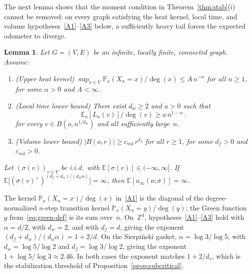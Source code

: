 \documentclass[aop]{imsart}
\theoremstyle{plain}
\newtheorem{lemma}[theorem]{Lemma}
\theoremstyle{definition}
\newcommand{\Z}{\mathbb{Z}}
\newcommand{\E}{\mathbb{E}}
\renewcommand{\P}{\mathbb{P}}
\begin{document}
	The next lemma shows that the moment condition in Theorem~\ref{thm:stab}(i) cannot be removed: on every graph satisfying the heat kernel, local time, and volume hypotheses~\ref{A1}--\ref{A3} below, a sufficiently heavy tail forces the expected odometer to diverge.
	\begin{lemma}\label{lem:moment-sharpness}
		Let $G=(V,E)$ be an infinite, locally finite, connected graph.  Assume:
		\begin{enumerate}[label=\textup{(A\arabic*)}]
			\item\label{A1} \textup{(Upper heat kernel)}\; $\sup_{x\in V}\P_x(X_n=x)/\deg(x)\leq A\,n^{-\alpha}$ for all $n\geq 1$, for some $\alpha>0$ and $A<\infty$.
			\item\label{A2} \textup{(Local time lower bound)}\; There exist $d_w\geq 2$ and $a>0$ such that
			\[
			\E_o[L_n(v)]/\deg(v)\geq a\,n^{1-\alpha}\,.
			\]
			for every $v\in B(o,n^{1/d_w})$ and all sufficiently large~$n$.
			\item\label{A3} \textup{(Volume lower bound)}\; $|B(o,r)|\geq c_{\mathrm{vol}}\,r^{d_f}$ for all $r\geq 1$, for some $d_f>0$ and $c_{\mathrm{vol}}>0$.
		\end{enumerate}
		Let $(\sigma(v))_{v\in V}$ be i.i.d.\ with $\E[\sigma(v)]\in(-\infty,\infty]$.
		If $\E\bigl[(\sigma(v)^+)^{(d_f+d_w)/(d_w\alpha)}\bigr]=\infty$, then $\E[u_\infty(o;\sigma)]=\infty$.
	\end{lemma}
	
	The kernel $\P_x(X_n=x)/\deg(x)$ in~\ref{A1} is the diagonal of the degree-normalized $n$-step transition kernel $\P_x(X_n=y)/\deg(y)$; the Green function~$g$ from~\eqref{eq:green-def} is its sum over~$n$. On~$\Z^d$, hypotheses~\ref{A1}--\ref{A3} hold with $\alpha=d/2$, with $d_w=2$, and with $d_f=d$, giving the exponent $(d_f+d_w)/(d_w\alpha)=1+2/d$. On the Sierpi\'nski gasket, $\alpha=\log 3/\log 5$, with $d_w=\log 5/\log 2$ and $d_f=\log 3/\log 2$, giving the exponent $1+\log 5/\log 3\approx 2.46$. In both cases the exponent matches $1+2/d_s$, which is the stabilization threshold of Proposition~\ref{prop:subcritical}.
	
\end{document}
